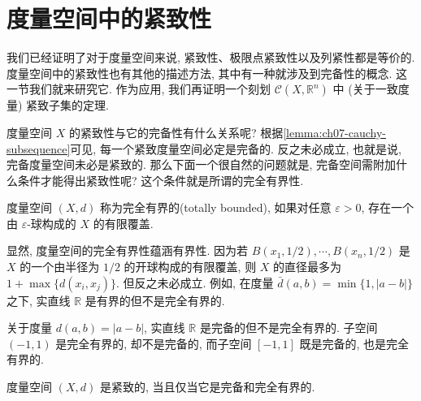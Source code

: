 \documentclass[../../main.tex]{subfiles}
\begin{document}
\section{度量空间中的紧致性}\label{section:ch07-compactness-metric}

我们已经证明了对于度量空间来说, 紧致性、极限点紧致性以及列紧性都是等价的. 度量空间中的紧致性也有其他的描述方法, 其中有一种就涉及到完备性的概念. 这一节我们就来研究它. 作为应用, 我们再证明一个刻划 $\mathcal{C}(X,\mathbb{R}^n)$ 中 (关于一致度量) 紧致子集的定理.

度量空间 $X$ 的紧致性与它的完备性有什么关系呢? 根据\cref{lemma:ch07-cauchy-subsequence}可见, 每一个紧致度量空间必定是完备的. 反之未必成立, 也就是说, 完备度量空间未必是紧致的. 那么下面一个很自然的问题就是, 完备空间需附加什么条件才能得出紧致性呢? 这个条件就是所谓的完全有界性.

\begin{definition}\label{definition:ch07-totally-bounded}
度量空间 $(X,d)$ 称为完全有界的(totally bounded), 如果对任意 $\varepsilon>0$, 存在一个由 $\varepsilon$-球构成的 $X$ 的有限覆盖.
\end{definition}

\begin{example}\label{example:ch07-totally-bounded-vs-bounded}
显然, 度量空间的完全有界性蕴涵有界性. 因为若 $B(x_1,1/2),\cdots,B(x_n,1/2)$ 是 $X$ 的一个由半径为 $1/2$ 的开球构成的有限覆盖, 则 $X$ 的直径最多为 $1+\max\{d(x_i,x_j)\}$. 但反之未必成立. 例如, 在度量 $\bar{d}(a,b)=\min\{1,|a-b|\}$ 之下, 实直线 $\mathbb{R}$ 是有界的但不是完全有界的.
\end{example}

\begin{example}\label{example:ch07-complete-totally-bounded}
关于度量 $d(a,b)=|a-b|$, 实直线 $\mathbb{R}$ 是完备的但不是完全有界的. 子空间 $(-1,1)$ 是完全有界的, 却不是完备的, 而子空间 $[-1,1]$ 既是完备的, 也是完全有界的.
\end{example}

\begin{theorem}\label{theorem:ch07-compact-complete-totally}
度量空间 $(X,d)$ 是紧致的, 当且仅当它是完备和完全有界的.
\end{theorem}
\end{document}
